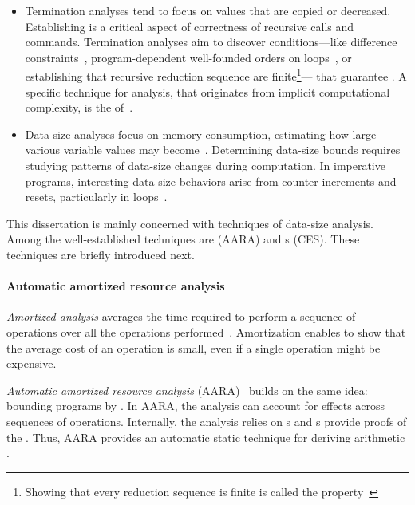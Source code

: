 \begin{itemize}
\item Termination analyses tend to focus on values that are copied or decreased.
    Establishing  is a critical aspect of correctness of
    recursive calls and commands. Termination analyses aim to discover
    conditions---like difference constraints~\cite{sinn2017}, program-dependent
    well-founded orders on loops~\cite{lee2001}, or establishing that recursive
    reduction sequence are finite\footnote{Showing that every reduction
    sequence is finite is called the \emph{}
    property~\cite[p. 36]{bertot2004}}--- that guarantee . A
    specific technique for  analysis, that originates from
    implicit computational complexity, is the  of~\textcite{lee2001}.
\item Data-size analyses focus on memory consumption, estimating how large
    various variable values may become~\cite{lommen2023}. Determining data-size
    bounds requires studying patterns of data-size changes during computation.
    In imperative programs, interesting data-size behaviors arise from counter
    increments and resets, particularly in loops~\cite{sinn2017,benamram2020}.
\end{itemize}

This dissertation is mainly concerned with techniques of data-size analysis.
Among the well-established techniques are  (AARA) and s (CES). These techniques are
briefly introduced next.

\paragraph*{Automatic amortized resource analysis}  \emph{Amortized analysis} averages
the time required to perform a sequence of operations over all the operations
performed~\cite[p. 451]{cormen2009}. Amortization enables to
show that the average cost of an operation is small, even if a single operation
might be expensive.

\emph{Automatic amortized resource analysis}
(AARA)~\cite{hoffmann2022} builds
on the same idea: bounding programs by . In AARA, the analysis
can account for  effects across sequences of operations.
Internally, the analysis relies on s and s provide proofs of the . Thus, AARA provides an
automatic static technique for deriving arithmetic .

